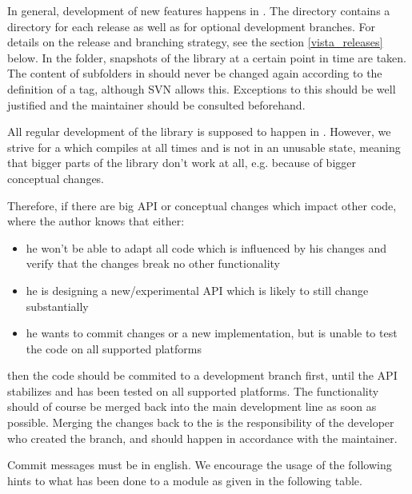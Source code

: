 In general, development of new features happens in .
The  directory contains a directory for each  release as well as for optional development branches. 
For details on the release and branching strategy, see the section \ref{vista_releases} below.
In the  folder, snapshots of the library at a certain point in time are taken.
The content of subfolders in  should never be changed again according to the definition of a tag, although SVN allows this.
Exceptions to this should be well justified and the maintainer should be consulted beforehand.

All regular development of the library is supposed to happen in .
However, we strive for a  which compiles at all times and is not in an unusable state, meaning that bigger parts of the library don't work at all, e.g. because of bigger conceptual changes.

Therefore, if there are big API or conceptual changes which impact other code, where the author knows that either:

\begin{itemize}
\item he won't be able to adapt all code which is influenced by his changes and verify that the changes break no other functionality
\item he is designing a new/experimental API which is likely to still change substantially
\item he wants to commit changes or a new implementation, but is unable to test the code on all supported platforms
\end{itemize}

then the code should be commited to a development branch first, until the API stabilizes and has been tested on all supported platforms.
The functionality should of course be merged back into the main development line as soon as possible.
Merging the changes back to the  is the responsibility of the developer who created the branch, and should happen in accordance with the  maintainer.

Commit messages must be in english.
We encourage the usage of the following hints to what has been done to a module as given in the following table.


